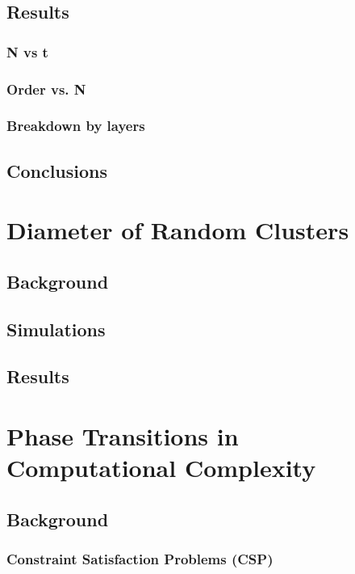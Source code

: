 \documentclass{article}
\begin{document}
{\subsection{Results}

\subsubsection{N vs t}

\subsubsection{Order vs. N}

\subsubsection{Breakdown by layers}

\subsection{Conclusions}

\section{Diameter of Random Clusters}

\subsection{Background}

\subsection{Simulations}

\subsection{Results}

\section{Phase Transitions in Computational Complexity}

\subsection{Background}

\subsubsection{Constraint Satisfaction Problems (CSP)}



}
\end{document}
